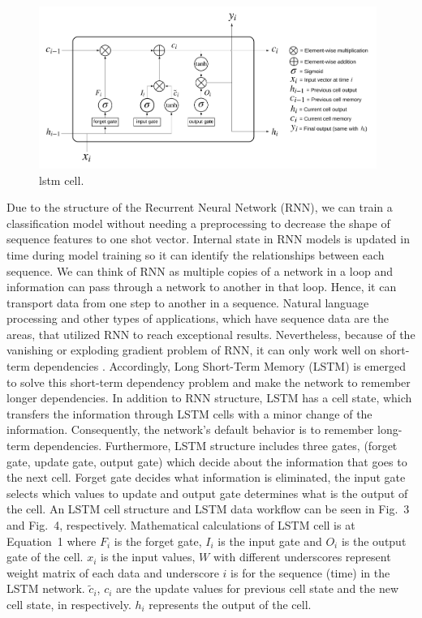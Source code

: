 \documentclass[3p,times,procedia]{elsarticle}
\begin{document}
\begin{figure}[t]\vspace*{4pt}
\centerline{\includegraphics[width=110mm]{graphics/LSTM_Cell.png}}
\caption{lstm cell.}
\end{figure}

Due to the structure of the Recurrent Neural Network (RNN), we can train a classification model without needing a preprocessing to decrease the shape of sequence features to one shot vector. Internal state in RNN models is updated in time during model training so it can identify the relationships between each sequence. We can think of RNN as multiple copies of a network in a loop and information can pass through a network to another in that loop. Hence, it can transport data from one step to another in a sequence. Natural language processing and other types of applications, which have sequence data are the areas, that utilized RNN to reach exceptional results. Nevertheless, because of the vanishing or exploding gradient problem of RNN, it can only work well on short-term dependencies \cite{Bengio1994}. Accordingly, Long Short-Term Memory (LSTM) \cite{Hochreiter1994} is emerged to solve this short-term dependency problem and make the network to remember longer dependencies. In addition to RNN structure, LSTM has a cell state, which transfers the information through LSTM cells with a minor change of the information. Consequently, the network's default behavior is to remember long-term dependencies. Furthermore, LSTM structure includes three gates, (forget gate, update gate, output gate) which decide about the information that goes to the next cell. Forget gate decides what information is eliminated, the input gate selects which values to update and output gate determines what is the output of the cell. An LSTM cell structure and LSTM data workflow can be seen in Fig.~3 and Fig.~4, respectively. Mathematical calculations of LSTM cell is at Equation~1 where $F_{i}$ is the forget gate, $I_{i}$ is the input gate and $O_{i}$ is the output gate of the cell. $x_{i}$ is the input values, $W$ with different underscores represent weight matrix of each data and underscore $i$ is for the sequence (time) in the LSTM network. $\tilde{c}_{i}$, $c_{i}$ are the update values for previous cell state and the new cell state, in respectively. $h_{i}$ represents the output of the cell.
\end{document}
